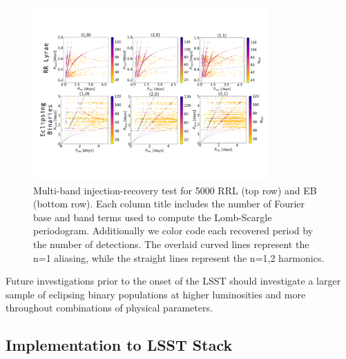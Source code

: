 \documentclass[DM,authoryear,toc]{lsstdoc}
\begin{document}
\begin{figure}
  \includegraphics[width=0.8\textwidth]{figures/multi_lsp_rectest.pdf}
  \centering 
  \caption{Multi-band injection-recovery test for 5000 RRL (top row) and EB (bottom row).
Each column title includes the number of Fourier base and band terms used to compute the Lomb-Scargle periodogram. Additionally we color code each recovered period by the number of detections. The overlaid curved lines represent the n=1 aliasing, while the straight lines represent the n=1,2 harmonics.}
  \label{fig:multi_lsp_custom}
\end{figure}

Future investigations prior to the onset of the LSST should investigate a larger sample of eclipsing binary populations at higher luminosities and more throughout  combinations of physical parameters.

\subsection{Implementation to LSST Stack}\label{sec:stack}
\end{document}
